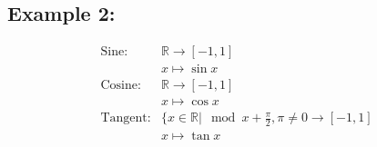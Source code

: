 \documentclass[class=article, crop=false]{standalone}
\begin{document}
\subsection*{Example 2:}
\begin{align*}
\text{Sine} : & \mathbb{R} \rightarrow [-1,1] \\
& x \mapsto \sin{x} \\
\text{Cosine}: & \mathbb{R} \rightarrow [-1,1] \\
& x \mapsto \cos{x} \\
\text{Tangent}: & \{ x \in \mathbb{R} \vert \mod{x + \frac{\pi}{2},\pi} \neq 0 \rightarrow [-1,1] \\
& x \mapsto \tan{x} \\
\end{align*}
\end{document}
